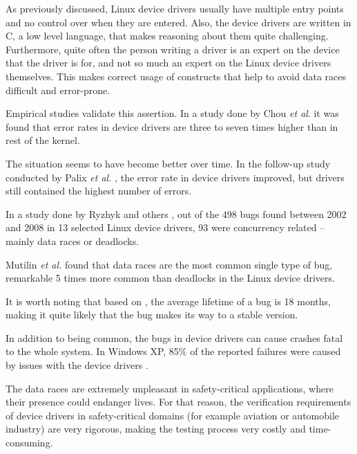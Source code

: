 \documentclass[..thesis.tex]{subfiles}
\begin{document}
As previously discussed, Linux device drivers usually have multiple entry points and no control over when they are entered. Also, the device drivers are written in C,
a low level language, that makes reasoning about them quite challenging. Furthermore, quite often the person writing a driver is an expert on the device that the driver is for,
and not so much an expert on the Linux device drivers themselves. This makes correct usage of constructs that help to avoid data races difficult and error-prone.



Empirical studies validate this assertion. In a study done by Chou \textit{et al}. \cite{chou_empirical_2001} it was found that error rates in device drivers are three to seven times higher than in rest of the kernel. 

The situation seems to have become better over time. In the follow-up study conducted by Palix \textit{et al.} \cite{palix_faults_2011}, the error rate in device drivers improved, but drivers still contained the highest number of errors.

In a study done by Ryzhyk and others \cite{ryzhyk_dingo_2009}, out of the 498 bugs found between 2002 and 2008 in 13 selected Linux device drivers, 93 were concurrency related -- mainly data races or deadlocks. 

Mutilin \textit{et al.} \cite{mutilin_analysis_2012} found that data races are the most common single type of bug, remarkable 5 times more common than deadlocks in the Linux device drivers.

It is worth noting that based on \cite{chou_empirical_2001,palix_faults_2011}, the average lifetime of a bug is 18 months, making it quite likely that the bug makes its way to a stable version. 


In addition to being common, the bugs in device drivers can cause crashes fatal to the whole system. In Windows XP, 85\% of the reported failures were caused by issues with the device drivers \cite{swift_improving_2003}.

The data races are extremely unpleasant in safety-critical applications, where their presence could endanger lives. For that reason, the verification requirements of device drivers in safety-critical domains (for example aviation or automobile industry) are very rigorous, making the testing process very costly and time-consuming.
\end{document}

